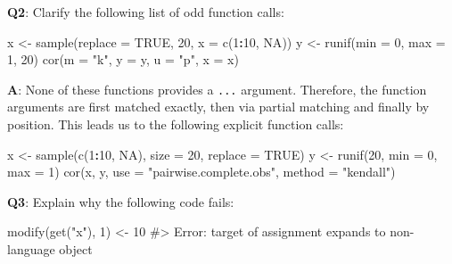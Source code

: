 \documentclass[
]{krantz}
\makeatletter
\newenvironment{Shaded}{\begin{snugshade}}{\end{snugshade}}
\newcommand{\CommentTok}[1]{\textcolor[rgb]{0.56,0.35,0.01}{\textit{#1}}}
\newcommand{\DataTypeTok}[1]{\textcolor[rgb]{0.13,0.29,0.53}{#1}}
\newcommand{\DecValTok}[1]{\textcolor[rgb]{0.00,0.00,0.81}{#1}}
\newcommand{\KeywordTok}[1]{\textcolor[rgb]{0.13,0.29,0.53}{\textbf{#1}}}
\newcommand{\NormalTok}[1]{#1}
\newcommand{\OperatorTok}[1]{\textcolor[rgb]{0.81,0.36,0.00}{\textbf{#1}}}
\newcommand{\OtherTok}[1]{\textcolor[rgb]{0.56,0.35,0.01}{#1}}
\newcommand{\StringTok}[1]{\textcolor[rgb]{0.31,0.60,0.02}{#1}}
\newenvironment{kframe}{%
\medskip{}
\setlength{\fboxsep}{.8em}
 \def\at@end@of@kframe{}%
 \ifinner\ifhmode%
  \def\at@end@of@kframe{\end{minipage}}%
  \begin{minipage}{\columnwidth}%
 \fi\fi%
 \def\FrameCommand##1{\hskip\@totalleftmargin \hskip-\fboxsep
 \colorbox{shadecolor}{##1}\hskip-\fboxsep
     \hskip-\linewidth \hskip-\@totalleftmargin \hskip\columnwidth}%
 \MakeFramed {\advance\hsize-\width
   \@totalleftmargin\z@ \linewidth\hsize
   \@setminipage}}%
 {\par\unskip\endMakeFramed%
 \at@end@of@kframe}
\renewenvironment{Shaded}{\begin{kframe}}{\end{kframe}}
\renewcommand{\KeywordTok} [1]{\textcolor[rgb]{0.00,0.44,0.13}{{#1}}}
\renewcommand{\DataTypeTok}[1]{\textcolor[rgb]{0.56,0.13,0.00}{{#1}}}
\renewcommand{\DecValTok}  [1]{\textcolor[rgb]{0.25,0.63,0.44}{{#1}}}
\renewcommand{\StringTok}  [1]{\textcolor[rgb]{0.25,0.44,0.63}{{#1}}}
\renewcommand{\CommentTok} [1]{\textcolor[rgb]{0.38,0.63,0.69}{{#1}}}
\renewcommand{\OtherTok}   [1]{\textcolor[rgb]{0.00,0.44,0.13}{{#1}}}
\renewcommand{\NormalTok}  [1]{{#1}}
\makeatother
\begin{document}
\textbf{{Q2}}: Clarify the following list of odd function calls:

\begin{Shaded}
\begin{Highlighting}[]
\NormalTok{x <-}\StringTok{ }\KeywordTok{sample}\NormalTok{(}\DataTypeTok{replace =} \OtherTok{TRUE}\NormalTok{, }\DecValTok{20}\NormalTok{, }\DataTypeTok{x =} \KeywordTok{c}\NormalTok{(}\DecValTok{1}\OperatorTok{:}\DecValTok{10}\NormalTok{, }\OtherTok{NA}\NormalTok{))}
\NormalTok{y <-}\StringTok{ }\KeywordTok{runif}\NormalTok{(}\DataTypeTok{min =} \DecValTok{0}\NormalTok{, }\DataTypeTok{max =} \DecValTok{1}\NormalTok{, }\DecValTok{20}\NormalTok{)}
\KeywordTok{cor}\NormalTok{(}\DataTypeTok{m =} \StringTok{"k"}\NormalTok{, }\DataTypeTok{y =}\NormalTok{ y, }\DataTypeTok{u =} \StringTok{"p"}\NormalTok{, }\DataTypeTok{x =}\NormalTok{ x)}
\end{Highlighting}
\end{Shaded}

\textbf{{A}}: None of these functions provides a \texttt{...} argument. Therefore, the function arguments are first matched exactly, then via partial matching and finally by position. This leads us to the following explicit function calls:

\begin{Shaded}
\begin{Highlighting}[]
\NormalTok{x <-}\StringTok{ }\KeywordTok{sample}\NormalTok{(}\KeywordTok{c}\NormalTok{(}\DecValTok{1}\OperatorTok{:}\DecValTok{10}\NormalTok{, }\OtherTok{NA}\NormalTok{), }\DataTypeTok{size =} \DecValTok{20}\NormalTok{, }\DataTypeTok{replace =} \OtherTok{TRUE}\NormalTok{)}
\NormalTok{y <-}\StringTok{ }\KeywordTok{runif}\NormalTok{(}\DecValTok{20}\NormalTok{, }\DataTypeTok{min =} \DecValTok{0}\NormalTok{, }\DataTypeTok{max =} \DecValTok{1}\NormalTok{)}
\KeywordTok{cor}\NormalTok{(x, y, }\DataTypeTok{use =} \StringTok{"pairwise.complete.obs"}\NormalTok{, }\DataTypeTok{method =} \StringTok{"kendall"}\NormalTok{)}
\end{Highlighting}
\end{Shaded}

\textbf{{Q3}}: Explain why the following code fails:

\begin{Shaded}
\begin{Highlighting}[]
\KeywordTok{modify}\NormalTok{(}\KeywordTok{get}\NormalTok{(}\StringTok{"x"}\NormalTok{), }\DecValTok{1}\NormalTok{) <-}\StringTok{ }\DecValTok{10}
\CommentTok{#> Error: target of assignment expands to non-language object}
\end{Highlighting}
\end{Shaded}
\end{document}
